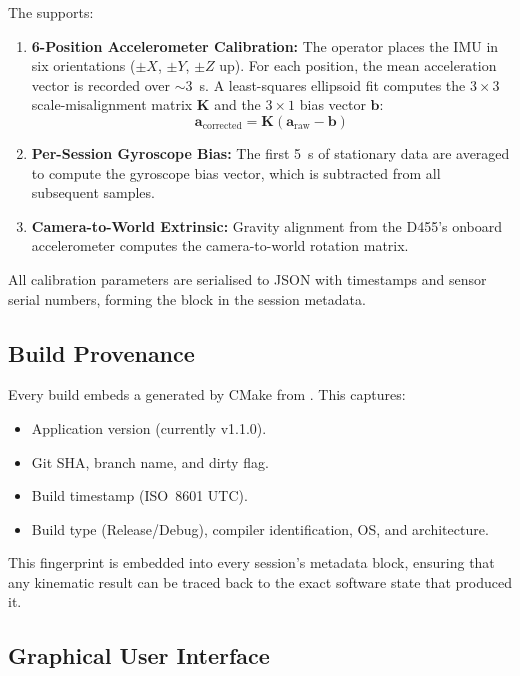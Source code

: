 The  supports:
\begin{enumerate}[nosep]
  \item \textbf{6-Position Accelerometer Calibration:} The operator places the IMU in six orientations ($\pm X$, $\pm Y$, $\pm Z$ up). For each position, the mean acceleration vector is recorded over $\sim$\SI{3}{\second}. A least-squares ellipsoid fit computes the $3\times3$ scale-misalignment matrix $\mathbf{K}$ and the $3\times1$ bias vector $\mathbf{b}$:
  \begin{equation}
    \mathbf{a}_\text{corrected} = \mathbf{K} \left( \mathbf{a}_\text{raw} - \mathbf{b} \right)
  \end{equation}
  \item \textbf{Per-Session Gyroscope Bias:} The first \SI{5}{\second} of stationary data are averaged to compute the gyroscope bias vector, which is subtracted from all subsequent samples.
  \item \textbf{Camera-to-World Extrinsic:} Gravity alignment from the D455's onboard accelerometer computes the camera-to-world rotation matrix.
\end{enumerate}

All calibration parameters are serialised to JSON with timestamps and sensor serial numbers, forming the  block in the session metadata.


\subsection{Build Provenance}

Every build embeds a  generated by CMake from .
This captures:
\begin{itemize}[nosep]
  \item Application version (currently v1.1.0).
  \item Git SHA, branch name, and dirty flag.
  \item Build timestamp (ISO~8601 UTC).
  \item Build type (Release/Debug), compiler identification, OS, and architecture.
\end{itemize}

This fingerprint is embedded into every session's  metadata block, ensuring that any kinematic result can be traced back to the exact software state that produced it.


\subsection{Graphical User Interface}

